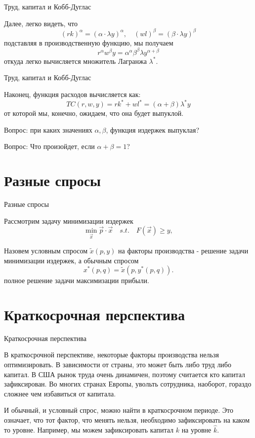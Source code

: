 \documentclass{beamer}
\begin{document}
\begin{frame}{Труд, капитал и Кобб-Дуглас}

Далее, легко видеть, что 
$$(r k)^{\alpha} = (\alpha \cdot \lambda y)^{\alpha}, \quad (w l)^{\beta} = (\beta \cdot \lambda y)^{\beta}$$
подставляя в производственную функцию, мы получаем
$$ r^{\alpha}w^{\beta} y = \alpha^{\alpha} \beta^{\beta} \lambda y^{\alpha + \beta}$$
откуда легко вычисляется множитель Лагранжа $\lambda^{\ast}$.

\end{frame}

\begin{frame}{Труд, капитал и Кобб-Дуглас}

Наконец, функция расходов вычисляется как:
$$ TC(r,w,y) = r k^{\ast} + w l^{\ast} = (\alpha + \beta) \lambda^{\ast} y$$
от которой мы, конечно, ожидаем, что она будет выпуклой.

Вопрос: при каких значениях $\alpha, \beta$, функция издержек выпуклая? 

Вопрос: Что произойдет, если $\alpha + \beta = 1$?

\end{frame}

\section{Разные спросы}

\begin{frame}{Разные спросы}

Рассмотрим задачу минимизации издержек
$$ \min_{\vec x} \vec p \cdot \vec x \quad s.t. \quad F(\vec x) \geqslant y,$$

\begin{definition}
Назовем условным спросом $\tilde x(p, y)$ на факторы производства - решение задачи минимизации издержек, а обычным спросом
$$x^{\ast}(p, q) = \tilde x(p, y^{\ast}(p, q)).$$
полное решение задачи максимизации прибыли.
\end{definition}

\end{frame}

\section{Краткосрочная перспектива}

\begin{frame}{Краткосрочная перспектива}

В краткосрочной перспективе, некоторые факторы производства нельзя оптимизировать. В зависимости от страны, это может быть либо труд либо капитал. В США рынок труда очень динамичен, поэтому считается кто капитал зафиксирован. Во многих странах Европы, увольть сотрудника, наоборот, гораздо сложнее чем избавиться от капитала. 

И обычный, и условный спрос, можно найти в краткосрочном периоде. Это означает, что тот фактор, что менять нельзя, необходимо зафиксировать на каком то уровне. Например, мы можем зафиксировать капитал $k$ на уровне $\hat k$.

\end{frame}
\end{document}
